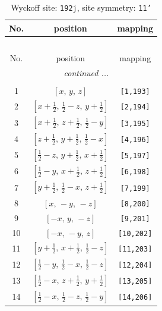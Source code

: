 \documentclass[fleqn,8pt]{jsarticle}
\begin{document}
\begin{longtable}{ccc}
\caption{Wyckoff site: {\tt 192j}, site symmetry: {\tt 11'}}
 \\
 \hline \hline
No. & position & mapping \\ \hline \endfirsthead

\multicolumn{2}{l}{\tablename\ \thetable{}} \\
 \hline \hline
No. & position & mapping \\ \hline \endhead

 \hline \hline
\multicolumn{2}{r}{\footnotesize\it continued ...} \\ \endfoot

 \hline \hline
\multicolumn{2}{r}{} \\ \endlastfoot

1 & $\left[ x,\, y,\, z \right]$ & {\tt [1,193]} \\ \hline
2 & $\left[ x + \frac{1}{2},\, \frac{1}{2} - z,\, y + \frac{1}{2} \right]$ & {\tt [2,194]} \\ \hline
3 & $\left[ x + \frac{1}{2},\, z + \frac{1}{2},\, \frac{1}{2} - y \right]$ & {\tt [3,195]} \\ \hline
4 & $\left[ z + \frac{1}{2},\, y + \frac{1}{2},\, \frac{1}{2} - x \right]$ & {\tt [4,196]} \\ \hline
5 & $\left[ \frac{1}{2} - z,\, y + \frac{1}{2},\, x + \frac{1}{2} \right]$ & {\tt [5,197]} \\ \hline
6 & $\left[ \frac{1}{2} - y,\, x + \frac{1}{2},\, z + \frac{1}{2} \right]$ & {\tt [6,198]} \\ \hline
7 & $\left[ y + \frac{1}{2},\, \frac{1}{2} - x,\, z + \frac{1}{2} \right]$ & {\tt [7,199]} \\ \hline
8 & $\left[ x,\, - y,\, - z \right]$ & {\tt [8,200]} \\ \hline
9 & $\left[ - x,\, y,\, - z \right]$ & {\tt [9,201]} \\ \hline
10 & $\left[ - x,\, - y,\, z \right]$ & {\tt [10,202]} \\ \hline
11 & $\left[ y + \frac{1}{2},\, x + \frac{1}{2},\, \frac{1}{2} - z \right]$ & {\tt [11,203]} \\ \hline
12 & $\left[ \frac{1}{2} - y,\, \frac{1}{2} - x,\, \frac{1}{2} - z \right]$ & {\tt [12,204]} \\ \hline
13 & $\left[ \frac{1}{2} - x,\, z + \frac{1}{2},\, y + \frac{1}{2} \right]$ & {\tt [13,205]} \\ \hline
14 & $\left[ \frac{1}{2} - x,\, \frac{1}{2} - z,\, \frac{1}{2} - y \right]$ & {\tt [14,206]} \\ \hline

\end{longtable}
\end{document}
